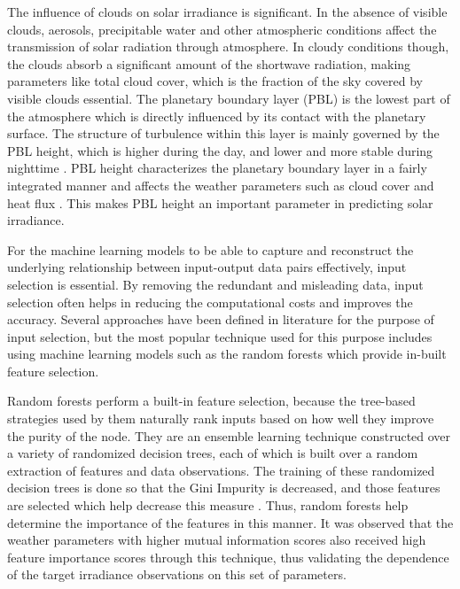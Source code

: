 \par The influence of clouds on solar irradiance is significant. In the absence of visible clouds, aerosols, precipitable water and other atmospheric conditions affect the transmission of solar radiation through atmosphere. In cloudy conditions though, the clouds absorb a significant amount of the shortwave radiation, making parameters like total cloud cover, which is the fraction of the sky covered by visible clouds essential. The planetary boundary layer (PBL) is the lowest part of the atmosphere which is directly influenced by its contact with the planetary surface. The structure of turbulence within this layer is mainly governed by the PBL height, which is higher during the day, and lower and more stable during nighttime \cite{feature_selection_pbl1}. PBL height characterizes the planetary boundary layer in a fairly integrated manner and affects the weather parameters such as cloud cover and heat flux \cite{feature_selection_pbl2}. This makes PBL height an important parameter in predicting solar irradiance.

\par For the machine learning models to be able to capture and reconstruct the underlying relationship between input-output data pairs effectively, input selection is essential. By removing the redundant and misleading data, input selection often helps in reducing the computational costs and improves the accuracy. Several approaches have been defined in literature for the purpose of input selection, but the most popular technique used for this purpose includes using machine learning models such as the random forests which provide in-built feature selection.

\par Random forests perform a built-in feature selection, because the tree-based strategies used by them naturally rank inputs based on how well they improve the purity of the node. They are an ensemble learning technique constructed over a variety of randomized decision trees, each of which is built over a random extraction of features and data observations. The training of these randomized decision trees is done so that the Gini Impurity is decreased, and those features are selected which help decrease this measure \cite{feature_selection_rf}. Thus, random forests help determine the importance of the features in this manner. It was observed that the weather parameters with higher mutual information scores also received high feature importance scores through this technique, thus validating the dependence of the target irradiance observations on this set of parameters.

